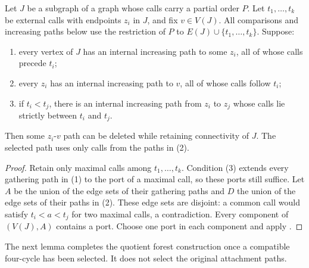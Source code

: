 \documentclass[USenglish, a4paper, thm-restate,numberwithinsect, cleveref]{lipics-v2021}
\begin{document}
\begin{lemma}\label{lem:characterization-antichain-selection}
Let $J$ be a subgraph of a graph whose calls carry a partial order
$P$. Let $t_1,\ldots,t_k$ be external calls with endpoints $z_i$ in
$J$, and fix $v\in V(J)$. All comparisons and increasing paths below
use the restriction of $P$ to $E(J)\cup\{t_1,\ldots,t_k\}$. Suppose:
\begin{enumerate}
\item every vertex of $J$ has an internal increasing path to some
 $z_i$, all of whose calls precede $t_i$;
\item every $z_i$ has an internal increasing path to $v$, all of
 whose calls follow $t_i$;
\item if $t_i<t_j$, there is an internal increasing path from $z_i$
 to $z_j$ whose calls lie strictly between $t_i$ and $t_j$.
\end{enumerate}
Then some $z_i$-$v$ path can be deleted while retaining connectivity
of $J$. The selected path uses only calls from the paths in (2).
\end{lemma}
\begin{proof}
Retain only maximal calls among $t_1,\ldots,t_k$. Condition (3)
extends every gathering path in (1) to the port of a maximal call,
so these ports still suffice. Let $A$ be the union of the edge sets of
their gathering paths and $D$ the union of the edge sets of their
paths in (2). These edge sets are
disjoint: a common call would satisfy $t_i<a<t_j$ for two maximal
calls, a contradiction. Every component of $(V(J),A)$ contains a
port. Choose one port in each component and apply
.
\end{proof}

The next lemma completes the quotient forest construction once a
compatible four-cycle has been selected. It does not select the
original attachment paths.
\end{document}

